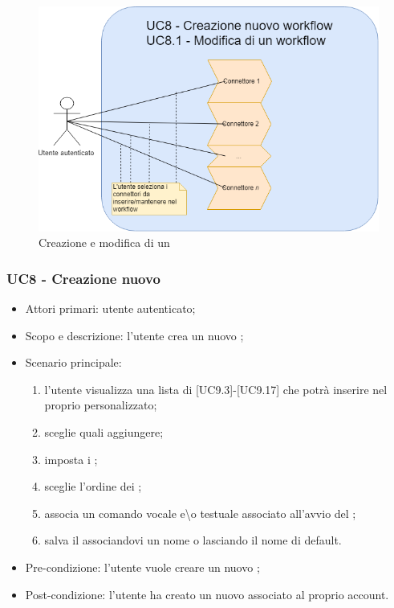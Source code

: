\begin{figure}[H]
	\centering
	\includegraphics[width=13cm,keepaspectratio]{../includes/pics/Creazione_modifica_workflow.png}
	\caption{\label{fig:mission}Creazione e modifica di un }
\end{figure}

\subsubsection{UC8 - Creazione nuovo }
\begin{itemize}
	\item  Attori primari: utente autenticato;
	\item  Scopo e descrizione: l'utente crea un nuovo ;
	\item  Scenario principale:  
	\begin{enumerate}
		\item l'utente visualizza una lista di  [UC9.3]-[UC9.17] che potrà inserire nel proprio  personalizzato;
		\item sceglie quali  aggiungere;
		\item imposta i ;
		\item sceglie l'ordine dei ;
		\item associa un comando vocale e\textbackslash o testuale associato all'avvio del ;
		\item salva il  associandovi un nome o lasciando il nome di default.
	\end{enumerate}
	\item  Pre-condizione: l'utente vuole creare un nuovo ;
	\item  Post-condizione: l'utente ha creato un nuovo  associato al proprio account.
\end{itemize}
